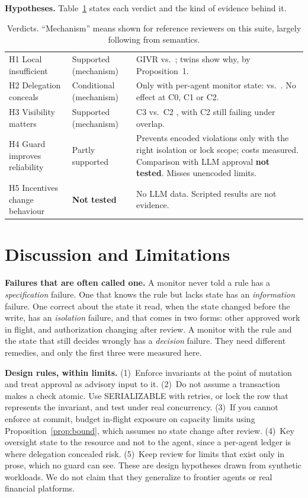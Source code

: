 \documentclass[10pt]{article}
\begin{document}
\textbf{Hypotheses.} Table~\ref{tab:hyp} states each verdict and the kind of evidence behind it.

\begin{table}[t]\centering\footnotesize
\caption{Verdicts. ``Mechanism'' means shown for reference reviewers on this suite, largely following from semantics.}\label{tab:hyp}
\begin{tabularx}{\linewidth}{@{}llX@{}}\toprule
H1 Local insufficient & Supported (mechanism) & GIVR \givrCzero{} vs.\ \givrCtwo{}; twins show why, by Proposition~1.\\
H2 Delegation conceals & Conditional (mechanism) & Only with per-agent monitor state: \hTwoConewSeqCen{} vs.\ \hTwoConewSeqDis{}. No effect at C0, C1 or C2.\\
H3 Visibility matters & Supported (mechanism) & C3 \givrCthreeKone{} vs.\ C2 \givrCtwo{}, with C2 still failing under overlap.\\
H4 Guard improves reliability & Partly supported & Prevents encoded violations only with the right isolation or lock scope; costs measured. Comparison with LLM approval \textbf{not tested}. Misses unencoded limits.\\
H5 Incentives change behaviour & \textbf{Not tested} & No LLM data. Scripted results are not evidence.\\
\bottomrule\end{tabularx}
\end{table}

\section{Discussion and Limitations}
\textbf{Failures that are often called one.} A monitor never told a rule has a \emph{specification} failure. One that knows the rule but lacks state has an \emph{information} failure. One correct about the state it read, when the state changed before the write, has an \emph{isolation} failure, and that comes in two forms: other approved work in flight, and authorization changing after review. A monitor with the rule and the state that still decides wrongly has a \emph{decision} failure. They need different remedies, and only the first three were measured here.

\textbf{Design rules, within limits.} (1)~Enforce invariants at the point of mutation and treat approval as advisory input to it. (2)~Do not assume a transaction makes a check atomic. Use SERIALIZABLE with retries, or lock the row that represents the invariant, and test under real concurrency. (3)~If you cannot enforce at commit, budget in-flight exposure on capacity limits using Proposition~\ref{prop:bound}, which assumes no state change after review. (4)~Key oversight state to the resource and not to the agent, since a per-agent ledger is where delegation concealed risk. (5)~Keep review for limits that exist only in prose, which no guard can see. These are design hypotheses drawn from synthetic workloads. We do not claim that they generalize to frontier agents or real financial platforms.
\end{document}

